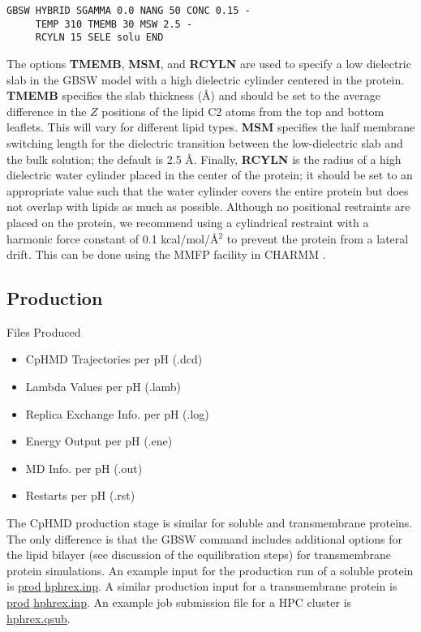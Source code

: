 \begin{lstlisting}
GBSW HYBRID SGAMMA 0.0 NANG 50 CONC 0.15 - 
     TEMP 310 TMEMB 30 MSW 2.5 -
     RCYLN 15 SELE solu END
\end{lstlisting}
%
The options \textbf{TMEMB}, \textbf{MSM}, and \textbf{RCYLN} are used 
to specify a low dielectric slab in the GBSW model with a high dielectric cylinder centered in the protein.
\textbf{TMEMB} specifies the slab thickness ($\mbox{\AA}$) and should be set to the average difference in the $Z$ positions of the lipid C2 atoms from the top and bottom leaflets. This will vary for different lipid types. 
\textbf{MSM} specifies the half membrane switching length for the dielectric transition between the low-dielectric slab and the bulk solution; 
the default is 2.5 {\AA}.
Finally, \textbf{RCYLN} is the radius of a high dielectric water cylinder placed in the center of the protein; 
it should be set to an appropriate value such that the water cylinder covers the entire protein but does not overlap with lipids as much as possible.
Although no positional restraints are placed on the protein, we recommend using a cylindrical restraint with a harmonic force constant of 0.1 kcal/mol/{\AA}$^{2}$ to prevent the protein from a lateral drift. 
This can be done using the MMFP facility in CHARMM \cite{Brooks_Karplus_2009_J.Comput.Chem.}.

\subsection{Production}

\begin{checklist}{Files Produced}
\begin{itemize}
\item CpHMD Trajectories per pH (.dcd)
\item Lambda Values per pH (.lamb)
\item Replica Exchange Info. per pH (.log)
\item Energy Output per pH (.ene)
\item MD Info. per pH (.out)
\item Restarts per pH (.rst)
\end{itemize}
\end{checklist}

The CpHMD production stage is similar for soluble and transmembrane proteins. The only difference is that the GBSW command includes additional options for the lipid bilayer (see discussion of the equilibration steps) for transmembrane protein simulations.
An example input for the production run of a
soluble protein is
\href{https://gitlab.com/shenlab-amber-cphmd/cphmd-tutorial/-/tree/main/hphmd_charmm/bbl_equil_prod}{prod$\_$hphrex.inp}.
A similar production input for a transmembrane protein is
\href{https://gitlab.com/shenlab-amber-cphmd/cphmd-tutorial/-/tree/main/memb_hphmd_charmm/prod}{prod$\_$hphrex.inp}.
An example job submission file for a HPC cluster is 
\href{https://gitlab.com/shenlab-amber-cphmd/cphmd-tutorial/-/tree/main/memb_hphmd_charmm/prod}{hphrex.qsub}.

